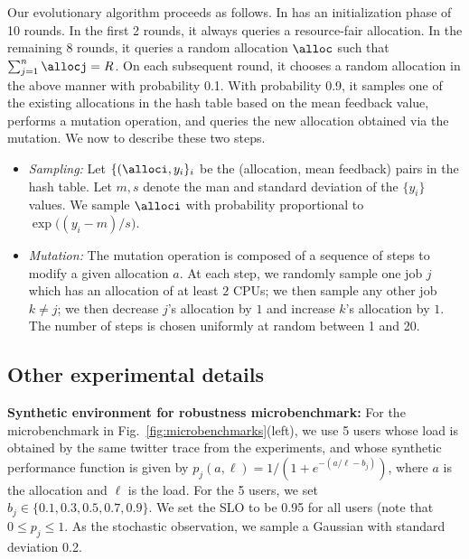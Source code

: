 Our evolutionary algorithm proceeds as follows.
In has an initialization phase of 10 rounds.
In the first 2 rounds, it always queries a resource-fair allocation.
In the remaining  8 rounds, it queries a random allocation $\alloc$ such that
$\sum_{j=1}^n\allocj=R$.
On each subsequent round, it chooses a random allocation in the above manner with probability 0.1.
With probability 0.9, it samples one of the existing allocations in the hash table based on the
mean feedback value, performs a mutation operation, and queries the new allocation obtained
via the mutation.
We now to describe these two steps.
\begin{itemize}
\item \emph{Sampling:} Let $\{(\alloci, y_i\}_i$ be the (allocation, mean feedback) pairs in the
hash table.
Let $m, s$ denote the man and standard deviation of the $\{y_i\}$  values.
We sample $\alloci$ with probability proportional to $\exp\big((y_i-m)/s\big)$.
\item \emph{Mutation:}
The mutation operation is composed of a sequence of steps to modify a given allocation $a$.
At each step, we randomly sample one job $j$ which has an allocation of at least $2$ CPUs;
we then sample any other job $k\neq j$; we then decrease $j$'s allocation by $1$ and increase
$k$'s allocation by $1$.
The number of steps is chosen uniformly at random between 1 and 20.
\end{itemize}



\subsection{Other experimental details}

\textbf{Synthetic environment for robustness microbenchmark:}
For the microbenchmark in Fig.~\ref{fig:microbenchmarks}(left), we use 5 users whose load is
obtained
by the same twitter trace from the experiments, and whose synthetic performance function is given by
$p_j(a, \ell) = 1/(1+e^{-(a/\ell - b_j)})$, where $a$ is the allocation and $\ell$ is the load.
For the 5 users, we set $b_j\in \{0.1, 0.3, 0.5, 0.7, 0.9\}$.
We set the SLO to be 0.95 for all users (note that $0\leq p_j\leq 1$.
As the stochastic observation, we sample a Gaussian with standard deviation 0.2.

